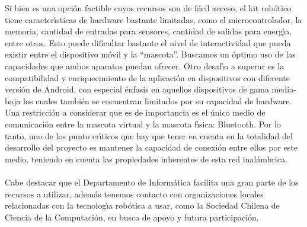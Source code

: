 \documentclass[letterpaper,12pt]{report} %
\numberwithin{equation}{section} %
\numberwithin{figure}{section} %
\numberwithin{table}{section} %
\begin{document}
Si bien es una opci\'on factible cuyos recursos son de f\'acil acceso,  el kit rob\'otico tiene caracter\'{\i}sticas de hardware bastante limitadas, como el microcontrolador, la memoria, cantidad de entradas para sensores, cantidad de salidas para energ\'{\i}a, entre otros. Esto puede dificultar bastante el nivel de interactividad que pueda existir entre el dispositivo m\'ovil y la ``mascota''. Buscamos un \'optimo uso de las capacidades que ambos aparatos puedan ofrecer. Otro desaf\'{\i}o a superar  es la compatibilidad y enriquecimiento de la aplicaci\'on en dispositivos con diferente versi\'on de Android, con especial \'enfasis en aquellos dispositivos de gama media-baja los cuales tambi\'en se encuentran limitados por su capacidad de hardware. Una restricci\'on a considerar que es de importancia es el \'unico medio de comunicaci\'on entre la mascota virtual y la mascota f\'{\i}sica: Bluetooth. Por lo tanto, uno de los punto cr\'{\i}ticos que hay que tener en cuenta en la totalidad del desarrollo del proyecto es mantener la capacidad  de conexi\'on entre ellos por este medio, teniendo en cuenta las propiedades inherentes de esta red inal\'ambrica.\\~\\
Cabe destacar que el Departamento de Inform\'atica facilita una gran parte de los recursos a utilizar, adem\'as tenemos contacto con organizaciones locales relacionadas con la tecnolog\'{\i}a rob\'otica a usar, como la Sociedad Chilena de Ciencia de la Computaci\'on, en busca de apoyo y futura participaci\'on.
\newpage
\end{document}
